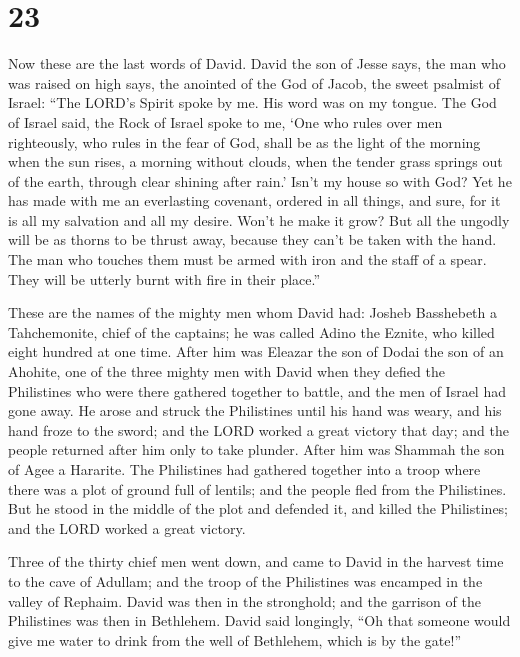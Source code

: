 \hypertarget{section-22}{%
\section{23}\label{section-22}}

 Now these are the last words of David. David the son of
Jesse says, the man who was raised on high says, the anointed of the God
of Jacob, the sweet psalmist of Israel:  ``The LORD's
Spirit spoke by me. His word was on my tongue.  The God of
Israel said, the Rock of Israel spoke to me, `One who rules over men
righteously, who rules in the fear of God,  shall be as
the light of the morning when the sun rises, a morning without clouds,
when the tender grass springs out of the earth, through clear shining
after rain.'  Isn't my house so with God? Yet he has made
with me an everlasting covenant, ordered in all things, and sure, for it
is all my salvation and all my desire. Won't he make it grow?
 But all the ungodly will be as thorns to be thrust away,
because they can't be taken with the hand.  The man who
touches them must be armed with iron and the staff of a spear. They will
be utterly burnt with fire in their place.''

 These are the names of the mighty men whom David had:
Josheb Basshebeth a Tahchemonite, chief of the captains; he was called
Adino the Eznite, who killed eight hundred at one time. 
After him was Eleazar the son of Dodai the son of an Ahohite, one of the
three mighty men with David when they defied the Philistines who were
there gathered together to battle, and the men of Israel had gone away.
 He arose and struck the Philistines until his hand was
weary, and his hand froze to the sword; and the LORD worked a great
victory that day; and the people returned after him only to take
plunder.  After him was Shammah the son of Agee a
Hararite. The Philistines had gathered together into a troop where there
was a plot of ground full of lentils; and the people fled from the
Philistines.  But he stood in the middle of the plot and
defended it, and killed the Philistines; and the LORD worked a great
victory.

 Three of the thirty chief men went down, and came to
David in the harvest time to the cave of Adullam; and the troop of the
Philistines was encamped in the valley of Rephaim.  David
was then in the stronghold; and the garrison of the Philistines was then
in Bethlehem.  David said longingly, ``Oh that someone
would give me water to drink from the well of Bethlehem, which is by the
gate!''


